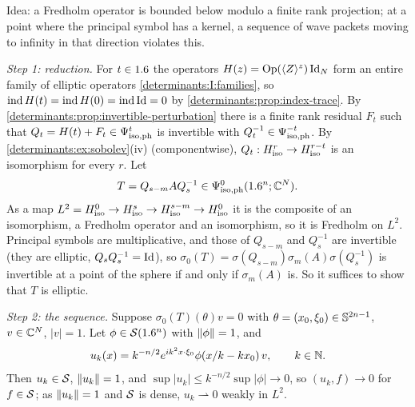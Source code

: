 \subsection*{}
Idea: a Fredholm operator is bounded below modulo a finite rank projection; at a point where the
principal symbol has a kernel, a sequence of wave packets moving to infinity in that direction
violates this.

\emph{Step 1: reduction.} For $t\in1.6$ the operators $H(z)=\operatorname{Op}(\langle Z\rangle^z)\operatorname{Id}_N$ form an entire family of
elliptic operators \ref{determinants:I:families}, so $\operatorname{ind} H(t)=\operatorname{ind} H(0)=\operatorname{ind}\operatorname{Id}=0$ by
\cref{determinants:prop:index-trace}. By \cref{determinants:prop:invertible-perturbation} there is a
finite rank residual $F_t$ such that $Q_t=H(t)+F_t\in\Psi^{t}_{\mathrm{iso,ph}}$ is invertible with
$Q_t^{-1}\in\Psi^{-t}_{\mathrm{iso,ph}}$. By \cref{determinants:ex:sobolev}(iv) (componentwise),
$Q_t:H^{r}_{\mathrm{iso}}\to H^{r-t}_{\mathrm{iso}}$ is an isomorphism for every $r$. Let
\begin{equation*}
  T=Q_{s-m}AQ_s^{-1}\in\Psi^{0}_{\mathrm{iso,ph}}(1.6^n;\mathbb{C}^N).
\end{equation*}
As a map $L^2=H^{0}_{\mathrm{iso}}\to H^{s}_{\mathrm{iso}}\to H^{s-m}_{\mathrm{iso}}\to H^{0}_{\mathrm{iso}}$ it is the composite of an isomorphism, a
Fredholm operator and an isomorphism, so it is Fredholm on $L^2$. Principal symbols are
multiplicative, and those of $Q_{s-m}$ and $Q_s^{-1}$ are invertible (they are elliptic, $Q_sQ_s^{-1}=\operatorname{Id}$),
so $\sigma_0(T)=\sigma(Q_{s-m})\sigma_m(A)\sigma(Q_s^{-1})$ is invertible at a point of the sphere if and
only if $\sigma_m(A)$ is. So it suffices to show that $T$ is elliptic.

\emph{Step 2: the sequence.} Suppose $\sigma_0(T)(\theta)v=0$ with $\theta=(x_0,\xi_0)\in\mathbb{S}^{2n-1}$,
$v\in\mathbb{C}^N$, $|v|=1$. Let $\phi\in\mathcal{S}(1.6^n)$ with $\lVert \phi\rVert=1$, and
\begin{equation*}
  u_k(x)=k^{-n/2}e^{ik^2x\cdot\xi_0}\phi(x/k-kx_0)\,v,\qquad k\in\mathbb{N} .
\end{equation*}
Then $u_k\in\mathcal{S}$, $\lVert u_k\rVert=1$, and $\sup|u_k|\le k^{-n/2}\sup|\phi|\to0$, so $(u_k,f)\to0$ for
$f\in\mathcal{S}$; as $\lVert u_k\rVert=1$ and $\mathcal{S}$ is dense, $u_k\rightharpoonup0$ weakly in $L^2$.

